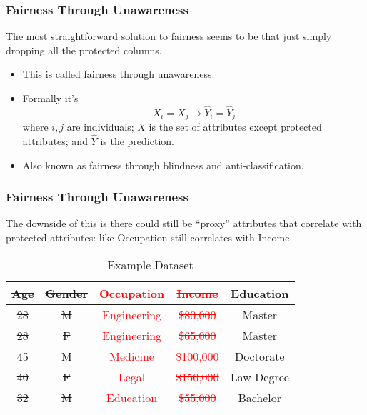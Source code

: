 \documentclass{beamer}
\renewcommand{\implies}{\rightarrow}
\newcommand{\red}[1]{\textcolor{red}{#1}}
\begin{document}
\begin{frame}
    \frametitle{Fairness Through Unawareness}
    The most straightforward solution to fairness seems to be that
    just simply dropping all the protected columns.
    \begin{itemize}
        \item This is called fairness through unawareness.
        \item Formally it's
        \[
            X_i = X_j \implies \hat{Y}_i = \hat{Y}_j
        \]
        where $i,j$ are individuals; $X$ is the set of attributes
        except protected attributes; and $\hat{Y}$ is the prediction.
        \item Also known as fairness through blindness and
        anti-classification.
    \end{itemize}
\end{frame}

\begin{frame}
    \frametitle{Fairness Through Unawareness}
    The downside of this is there could still be ``proxy'' attributes
    that correlate with protected attributes: like Occupation still
    correlates with Income.
    \begin{table}
        \begin{tabular}{|c|c|c|c|c|}
            \hline
            \sout{Age} & \sout{Gender}   & \red{Occupation}  & \red{\sout{Income}}   & Education \\
            \hline
            \sout{28} & \sout{M} & \red{Engineering} & \red{\sout{\$80,000}} & Master \\
            \sout{28} & \sout{F} & \red{Engineering} & \red{\sout{\$65,000}} & Master \\
            \sout{45} & \sout{M} & \red{Medicine}    & \red{\sout{\$100,000}} & Doctorate \\
            \sout{40} & \sout{F} & \red{Legal}       & \red{\sout{\$150,000}} & Law Degree \\
            \sout{32} & \sout{M} & \red{Education}   & \red{\sout{\$55,000}} & Bachelor \\
            \hline
        \end{tabular}
        \caption{Example Dataset}
    \end{table}
\end{frame}
\end{document}
